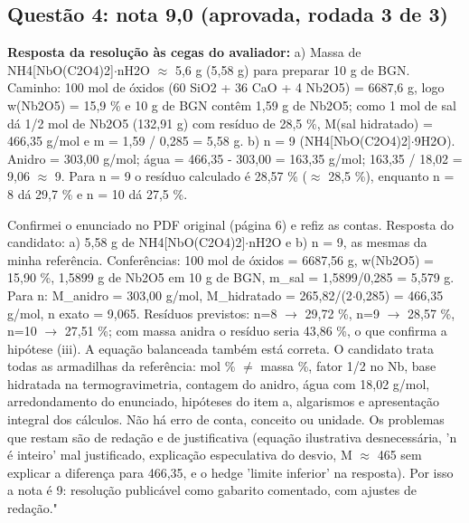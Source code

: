 \documentclass{article}%
\begin{document}
\subsection*{Questão 4: nota 9,0 (aprovada, rodada 3 de 3)}%
\textbf{Resposta da resolução às cegas do avaliador:} a) Massa de NH4{[}NbO(C2O4)2{]}$\cdot$nH2O $\approx$ 5,6 g (5,58 g) para preparar 10 g de BGN. Caminho: 100 mol de óxidos (60 SiO2 + 36 CaO + 4 Nb2O5) = 6687,6 g, logo w(Nb2O5) = 15,9 \% e 10 g de BGN contêm 1,59 g de Nb2O5; como 1 mol de sal dá 1/2 mol de Nb2O5 (132,91 g) com resíduo de 28,5 \%, M(sal hidratado) = 466,35 g/mol e m = 1,59 / 0,285 = 5,58 g.\newline%
\newline%
b) n = 9 (NH4{[}NbO(C2O4)2{]}$\cdot$9H2O). Anidro = 303,00 g/mol; água = 466,35 - 303,00 = 163,35 g/mol; 163,35 / 18,02 = 9,06 $\approx$ 9. Para n = 9 o resíduo calculado é 28,57 \% ($\approx$ 28,5 \%), enquanto n = 8 dá 29,7 \% e n = 10 dá 27,5 \%.\par %
Confirmei o enunciado no PDF original (página 6) e refiz as contas. Resposta do candidato: a) 5,58 g de NH4{[}NbO(C2O4)2{]}$\cdot$nH2O e b) n = 9, as mesmas da minha referência. Conferências: 100 mol de óxidos = 6687,56 g, w(Nb2O5) = 15,90 \%, 1,5899 g de Nb2O5 em 10 g de BGN, m\_sal = 1,5899/0,285 = 5,579 g. Para n: M\_anidro = 303,00 g/mol, M\_hidratado = 265,82/(2$\cdot$0,285) = 466,35 g/mol, n exato = 9,065. Resíduos previstos: n=8 $\to$ 29,72 \%, n=9 $\to$ 28,57 \%, n=10 $\to$ 27,51 \%; com massa anidra o resíduo seria 43,86 \%, o que confirma a hipótese (iii). A equação balanceada também está correta. O candidato trata todas as armadilhas da referência: mol \% $\neq$ massa \%, fator 1/2 no Nb, base hidratada na termogravimetria, contagem do anidro, água com 18,02 g/mol, arredondamento do enunciado, hipóteses do item a, algarismos e apresentação integral dos cálculos. Não há erro de conta, conceito ou unidade. Os problemas que restam são de redação e de justificativa (equação ilustrativa desnecessária, 'n é inteiro' mal justificado, explicação especulativa do desvio, M $\approx$ 465 sem explicar a diferença para 466,35, e o hedge 'limite inferior' na resposta). Por isso a nota é 9: resolução publicável como gabarito comentado, com ajustes de redação."%
\end{document}
